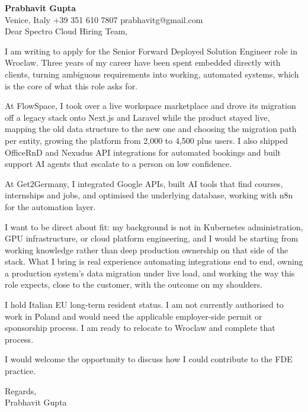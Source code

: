 \documentclass[a4paper,10.5pt]{article}
\begin{document}
\textbf{Prabhavit Gupta}\\
Venice, Italy \textbar{} +39 351 610 7807 \textbar{} prabhavitg@gmail.com\\[10pt]
Dear Spectro Cloud Hiring Team,

I am writing to apply for the Senior Forward Deployed Solution Engineer role in Wroclaw. Three years of my career have been spent embedded directly with clients, turning ambiguous requirements into working, automated systems, which is the core of what this role asks for.

At FlowSpace, I took over a live workspace marketplace and drove its migration off a legacy stack onto Next.js and Laravel while the product stayed live, mapping the old data structure to the new one and choosing the migration path per entity, growing the platform from 2,000 to 4,500 plus users. I also shipped OfficeRnD and Nexudus API integrations for automated bookings and built support AI agents that escalate to a person on low confidence.

At Get2Germany, I integrated Google APIs, built AI tools that find courses, internships and jobs, and optimised the underlying database, working with n8n for the automation layer.

I want to be direct about fit: my background is not in Kubernetes administration, GPU infrastructure, or cloud platform engineering, and I would be starting from working knowledge rather than deep production ownership on that side of the stack. What I bring is real experience automating integrations end to end, owning a production system's data migration under live load, and working the way this role expects, close to the customer, with the outcome on my shoulders.

I hold Italian EU long-term resident status. I am not currently authorised to work in Poland and would need the applicable employer-side permit or sponsorship process. I am ready to relocate to Wroclaw and complete that process.

I would welcome the opportunity to discuss how I could contribute to the FDE practice.

Regards,\\
Prabhavit Gupta
\end{document}
